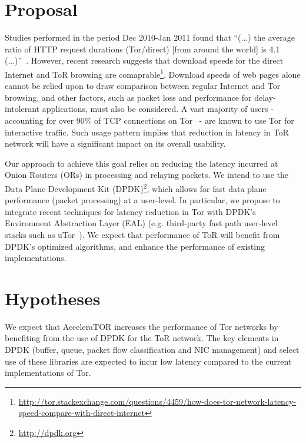 \documentclass[conference]{IEEEtran}
\begin{document}
%
\section{Proposal}

 
Studies performed in the period Dec 2010-Jan 2011 found that ``(...) the average ratio of HTTP request durations (Tor/direct) [from around the world] is 4.1 (...)''~\cite{fi4020488}. However, recent research suggests that  download speeds for the direct Internet and ToR browsing are comaprable\footnote{\label{note1}\url{http://tor.stackexchange.com/questions/4459/how-does-tor-network-latency-speed-compare-with-direct-internet}}. Download speeds of web pages alone cannot be relied upon to draw comparison between regular Internet and Tor browsing, and other factors, such as packet loss and performance for delay-intolerant applications,  must also be considered. A vast majority of users - accounting for over 90\% of TCP connections on Tor~\cite{Mccoy:2008:SLD:1428259.1428264} - are known to use Tor for interactive traffic. Such usage pattern implies that reduction in  latency in ToR network will have a significant impact on its overall usability. 

Our approach to achieve this goal relies on reducing the latency incurred at  Onion Routers (ORs) in processing and relaying packets.  We intend to  use  the Data Plane Development Kit (DPDK)\footnote{\url{http://dpdk.org}}, which allows for fast data plane performance (packet processing) at a user-level. In particular, we propose to integrate recent techniques for latency reduction in Tor with DPDK’s Environment Abstraction Layer (EAL) (e.g. third-party fast path user-level stacks such as uTor~\cite{179191}). We expect that performance of ToR will benefit from DPDK's optimized algorithms, and enhance the performance of existing implementations.


\section{Hypotheses}
We expect that AcceleraTOR increases the performance of Tor networks by benefiting from the use of DPDK for the ToR network. The key elements in DPDK (buffer, queue, packet flow classification and NIC management) and select use of these libraries are expected to incur low latency compared to the current implementations of Tor.
\end{document}
